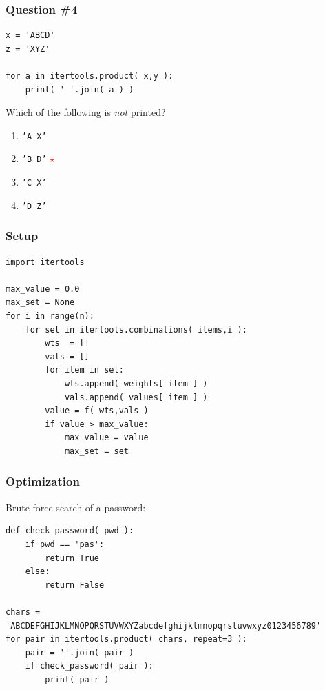 \documentclass[11pt]{beamer}
\newcommand{\correctstar}{\textcolor{red}{$\star$}}
\begin{document}
\begin{frame}[fragile]
  \frametitle{Question \#4}

  \begin{Verbatim}
x = 'ABCD'
z = 'XYZ'

for a in itertools.product( x,y ):
    print( ' '.join( a ) )
  \end{Verbatim}

Which of the following is \emph{not} printed?

  \begin{enumerate}[label=\Alph*]
    \item  \texttt{'A X'}
    \item  \texttt{'B D'}  \correctstar
    \item  \texttt{'C X'}
    \item  \texttt{'D Z'}
  \end{enumerate}
\end{frame}

\begin{frame}[fragile]
  \frametitle{Setup}

  \begin{Verbatim}
import itertools

max_value = 0.0
max_set = None
for i in range(n):
    for set in itertools.combinations( items,i ):
        wts  = []
        vals = []
        for item in set:
            wts.append( weights[ item ] )
            vals.append( values[ item ] )
        value = f( wts,vals )
        if value > max_value:
            max_value = value
            max_set = set
  \end{Verbatim}
\end{frame}

\begin{frame}[fragile]
  \frametitle{Optimization}

  \begin{enumerate}
  \myitem  Brute-force search of a password: %
  \end{enumerate}
  \begin{Verbatim}
def check_password( pwd ):
    if pwd == 'pas':
        return True
    else:
        return False

chars = 'ABCDEFGHIJKLMNOPQRSTUVWXYZabcdefghijklmnopqrstuvwxyz0123456789'
for pair in itertools.product( chars, repeat=3 ):
    pair = ''.join( pair )
    if check_password( pair ):
        print( pair )
  \end{Verbatim}
\end{frame}
\end{document}

